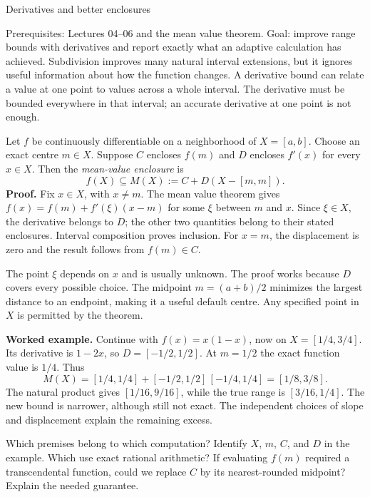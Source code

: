 \def\lecturenumber{07}


\opening{Derivatives and better enclosures}{Prerequisites: Lectures 04--06 and the mean value theorem.\newline
Goal: improve range bounds with derivatives and report exactly what an adaptive calculation has achieved.}
Subdivision improves many natural interval extensions, but it ignores useful
information about how the function changes. A derivative bound can relate a
value at one point to values across a whole interval. The derivative must be
bounded everywhere in that interval; an accurate derivative at one point is
not enough.

Let $f$ be continuously differentiable on a neighborhood of $X=[a,b]$.
Choose an exact centre $m\in X$. Suppose $C$ encloses $f(m)$ and $D$ encloses
$f'(x)$ for every $x\in X$. Then the \emph{mean-value enclosure} is
\[
               f(X)\subseteq M(X):=C+D(X-[m,m]).
\]
\textbf{Proof.} Fix $x\in X$, with $x\ne m$. The mean value theorem gives
$f(x)=f(m)+f'(\xi)(x-m)$ for some $\xi$ between $m$ and $x$. Since $\xi\in X$,
the derivative belongs to $D$; the other two quantities belong to their stated
enclosures. Interval composition proves inclusion. For $x=m$, the displacement
is zero and the result follows from $f(m)\in C$.

The point $\xi$ depends on $x$ and is usually unknown. The proof works because
$D$ covers every possible choice. The midpoint $m=(a+b)/2$ minimizes the
largest distance to an endpoint, making it a useful default centre. Any
specified point in $X$ is permitted by the theorem.

\textbf{Worked example.} Continue with $f(x)=x(1-x)$, now on $X=[1/4,3/4]$.
Its derivative is $1-2x$, so $D=[-1/2,1/2]$. At $m=1/2$ the exact function
value is $1/4$. Thus
\[
 M(X)=[1/4,1/4]+[-1/2,1/2]\,[-1/4,1/4]=[1/8,3/8].
\]
The natural product gives $[1/16,9/16]$, while the true range is
$[3/16,1/4]$. The new bound is narrower, although still not exact. The
independent choices of slope and displacement explain the remaining excess.

\begin{question}{Which premises belong to which computation?}
Identify $X$, $m$, $C$, and $D$ in the example. Which use exact rational
arithmetic? If evaluating $f(m)$ required a transcendental function, could
we replace $C$ by its nearest-rounded midpoint? Explain the needed guarantee.
\end{question}

